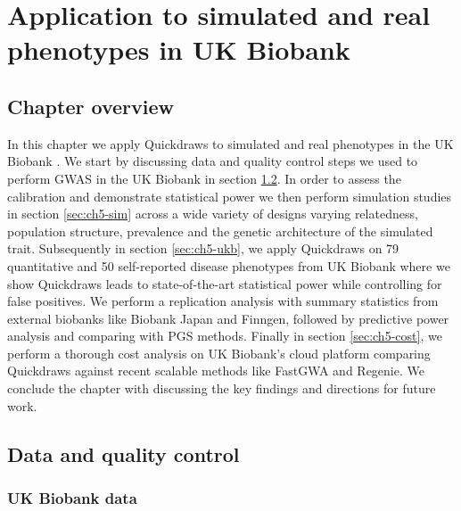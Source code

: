 \chapter{\label{ch:5-qd-result}Application to simulated and real phenotypes in UK Biobank}

\minitoc

\section{Chapter overview}

In this chapter we apply Quickdraws to simulated and real phenotypes in the UK Biobank \cite{bycroft2018uk}. We start by discussing data and quality control steps we used to perform GWAS in the UK Biobank in section \ref{sec:ch5-data}. In order to assess the calibration and demonstrate statistical power we then perform simulation studies in section \ref{sec:ch5-sim} across a wide variety of designs varying relatedness, population structure, prevalence and the genetic architecture of the simulated trait. Subsequently in section \ref{sec:ch5-ukb}, we apply Quickdraws on 79 quantitative and 50 self-reported disease phenotypes from UK Biobank where we show Quickdraws leads to state-of-the-art statistical power while controlling for false positives. We perform a replication analysis with summary statistics from external biobanks like Biobank Japan and Finngen, followed by predictive power analysis and comparing with PGS methods. Finally in section \ref{sec:ch5-cost}, we perform a thorough cost analysis on UK Biobank's cloud platform comparing Quickdraws against recent scalable methods like FastGWA and Regenie. We conclude the chapter with discussing the key findings and directions for future work.

\section{Data and quality control}
\label{sec:ch5-data}

\subsection{UK Biobank data}


